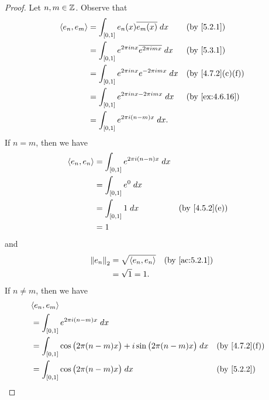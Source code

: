 \begin{proof}
  Let \(n, m \in \mathbb{Z}\).
  Observe that
  \begin{align*}
    \inner*{e_n, e_m} & = \int_{[0, 1]} e_n(x) \overline{e_m(x)} \; dx                   &  & \by{5.2.1}                     \\
                      & = \int_{[0, 1]} e^{2 \pi i n x} \overline{e^{2 \pi i m x}} \; dx &  & \by{5.3.1}                     \\
                      & = \int_{[0, 1]} e^{2 \pi i n x} e^{- 2 \pi i m x} \; dx          &  & \text{(by \cref{4.7.2}(c)(f))} \\
                      & = \int_{[0, 1]} e^{2 \pi i n x - 2 \pi i m x} \; dx              &  & \text{(by \cref{ex:4.6.16})}   \\
                      & = \int_{[0, 1]} e^{2 \pi i (n - m) x} \; dx.
  \end{align*}
  If \(n = m\), then we have
  \begin{align*}
    \inner*{e_n, e_n} & = \int_{[0, 1]} e^{2 \pi i (n - n) x} \; dx                                  \\
                      & = \int_{[0, 1]} e^0 \; dx                                                    \\
                      & = \int_{[0, 1]} 1 \; dx                     &  & \text{(by \cref{4.5.2}(e))} \\
                      & = 1
  \end{align*}
  and
  \begin{align*}
    \norm*{e_n}_2 & = \sqrt{\inner*{e_n, e_n}} &  & \text{(by \cref{ac:5.2.1})} \\
                  & = \sqrt{1} = 1.
  \end{align*}
  If \(n \neq m\), then we have
  \begin{align*}
     & \inner*{e_n, e_m}                                                                                                                \\
     & = \int_{[0, 1]} e^{2 \pi i (n - m) x} \; dx                                                                                      \\
     & = \int_{[0, 1]} \cos\big(2 \pi (n - m) x\big) + i \sin\big(2 \pi (n - m) x\big) \; dx        &  & \text{(by \cref{4.7.2}(f))}    \\
     & = \int_{[0, 1]} \cos\big(2 \pi (n - m) x\big) \; dx                                          &  & \by{5.2.2}                     \\

\end{align*}
\end{proof}
